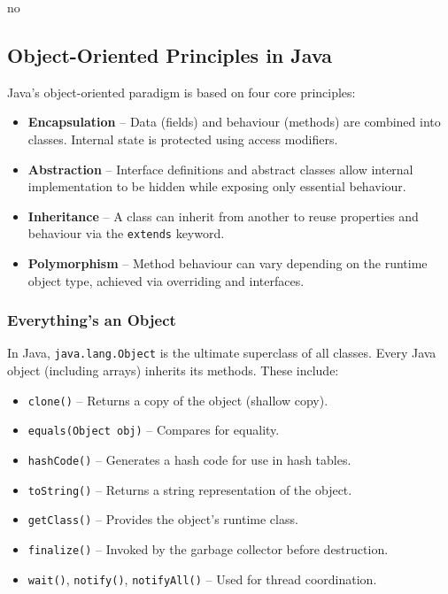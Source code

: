 no\documentclass{article}
\begin{document}
\subsection{Object-Oriented Principles in Java}

Java’s object-oriented paradigm is based on four core principles:

\begin{itemize}
    \item \textbf{Encapsulation} – Data (fields) and behaviour (methods) are combined into classes. Internal state is protected using access modifiers.
    \item \textbf{Abstraction} – Interface definitions and abstract classes allow internal implementation to be hidden while exposing only essential behaviour.
    \item \textbf{Inheritance} – A class can inherit from another to reuse properties and behaviour via the \texttt{extends} keyword.
    \item \textbf{Polymorphism} – Method behaviour can vary depending on the runtime object type, achieved via overriding and interfaces.
\end{itemize}

\subsubsection{Everything's an Object}

In Java, \texttt{java.lang.Object} is the ultimate superclass of all classes. Every Java object (including arrays) inherits its methods. These include:

\begin{itemize}
    \item \texttt{clone()} – Returns a copy of the object (shallow copy).
    \item \texttt{equals(Object obj)} – Compares for equality.
    \item \texttt{hashCode()} – Generates a hash code for use in hash tables.
    \item \texttt{toString()} – Returns a string representation of the object.
    \item \texttt{getClass()} – Provides the object's runtime class.
    \item \texttt{finalize()} – Invoked by the garbage collector before destruction.
    \item \texttt{wait()}, \texttt{notify()}, \texttt{notifyAll()} – Used for thread coordination.
\end{itemize}
\end{document}
